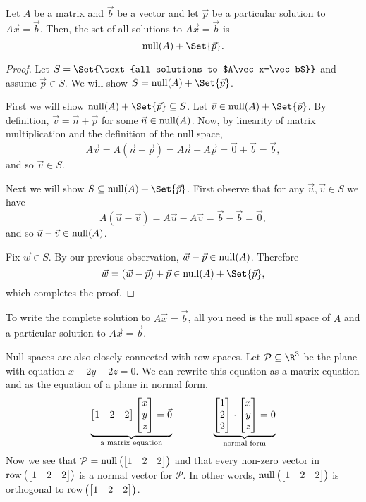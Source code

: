 \begin{theorem}
	Let $A$ be a matrix and $\vec b$ be a vector and let $\vec p$ be a particular solution
	to $A\vec x=\vec b$. Then, the set of all solutions to $A\vec x=\vec b$ is
	\[
		\Null(A)+\Set{\vec p}.
	\]
\end{theorem}
\begin{proof}
	Let $S=\Set{\text{all solutions to $A\vec x=\vec b$}}$ and assume $\vec p\in S$. We will show $S=\Null(A)+\Set{\vec p}$.

	First we will show $\Null(A)+\Set{\vec p}\subseteq S$. Let $\vec v\in \Null(A)+\Set{\vec p}$. By definition,
	$\vec v=\vec n+\vec p$ for some $\vec n\in \operatorname{null}(A)$. Now, by linearity of matrix multiplication 
	and the definition of the null space,
	\[
		A\vec v=A(\vec n+\vec p)=A\vec n+A\vec p=\vec 0+\vec b=\vec b,
	\]
	and so $\vec v\in S$.

	Next we will show $S\subseteq \Null(A)+\Set{\vec p}$. First observe that for any
	$\vec u,\vec v\in S$ we have
	\[
		A(\vec u-\vec v)=A\vec u-A\vec v=\vec b-\vec b=\vec 0,
	\]
	and so $\vec u-\vec v\in \operatorname{null}(A)$. 
	
	Fix $\vec w\in S$. By our previous observation, $\vec w-\vec p\in \operatorname{null}(A)$. Therefore 
	\[
		\vec w=(\vec w-\vec p)+\vec p\in \Null(A)+\Set{\vec p},
	\]
	which completes the proof.
\end{proof}


\begin{emphbox}[Takeaway]
	To write the complete solution to $A\vec x=\vec b$, all you need is the
	null space of $A$ and a particular solution to $A\vec x=\vec b$.
\end{emphbox}


\bigskip
Null spaces are also closely connected with row spaces. Let $\mathcal P\subseteq \R^3$ be the plane
with equation $x+2y+2z=0$. We can rewrite this equation as a matrix equation and as the equation
of a plane in normal form.
\[
	\underbrace{\mat{1&2&2}\mat{x\\y\\z}=\vec 0}_{\text{a matrix equation}}\qquad\qquad
	\underbrace{\mat{1\\2\\2}\cdot \mat{x\\y\\z}=0}_{\text{normal form}}
\]
Now we see that $\mathcal P=\Null\left(\mat{1&2&2}\right)$ and that every non-zero vector in $\Row\left(\mat{1&2&2}\right)$
is a normal vector for $\mathcal P$. In other words, $\Null\left(\mat{1&2&2}\right)$ is orthogonal to $\Row\left(\mat{1&2&2}\right)$.

